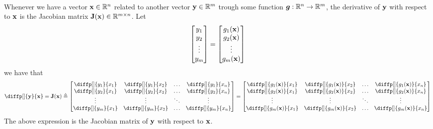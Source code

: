 \documentclass[12pt]{article}
\begin{document}
\\
Whenever we have a vector $\boldsymbol{\mathbf{x}} \in\mathbb{R}^n$ related to another vector $\boldsymbol{\mathbf{y}} \in\mathbb{R}^m$ trough some function $\boldsymbol{g}:\mathbb{R}^n\to\mathbb{R}^m$, the derivative of $\boldsymbol{\mathbf{y}}$ with respect to $\boldsymbol{\mathbf{x}}$ is the Jacobian matrix $\boldsymbol{\mathbf{J}}(\boldsymbol{\mathbf{x}}) \in\mathbb{R}^{m\times n}$. Let
\begin{equation*}
    \begin{bmatrix}
        y_1 \\ y_2 \\ \vdots \\ y_m
    \end{bmatrix} = 
    \begin{bmatrix}
        g_1(\boldsymbol{\mathbf{x}}) \\ g_2(\boldsymbol{\mathbf{x}}) \\ \vdots \\ g_m(\boldsymbol{\mathbf{x}})
    \end{bmatrix}
\end{equation*}
we have that
\renewcommand{\arraystretch}{1.5}
\begin{equation}
    \diffp[]{\bvec{y}}{\bvec{x}} = \mat{J}(\bvec{x}) \triangleq \begin{bmatrix}
        \diffp[]{y_1}{x_1} & \diffp[]{y_1}{x_2} & \dots & \diffp[]{y_1}{x_n} \\
        \diffp[]{y_2}{x_1} & \diffp[]{y_2}{x_2} & \dots & \diffp[]{y_2}{x_n} \\
        \vdots & \vdots & \ddots & \vdots \\
        \diffp[]{y_m}{x_1} & \diffp[]{y_m}{x_2} & \dots & \diffp[]{y_m}{x_n} \\
    \end{bmatrix} = 
    \begin{bmatrix}
        \diffp[]{g_1(\bvec{x})}{x_1} & \diffp[]{g_1(\bvec{x})}{x_2} & \dots & \diffp[]{g_1(\bvec{x})}{x_n} \\
        \diffp[]{g_2(\bvec{x})}{x_1} & \diffp[]{g_2(\bvec{x})}{x_2} & \dots & \diffp[]{g_2(\bvec{x})}{x_n} \\
        \vdots & \vdots & \ddots & \vdots \\
        \diffp[]{g_m(\bvec{x})}{x_1} & \diffp[]{g_m(\bvec{x})}{x_2} & \dots & \diffp[]{g_m(\bvec{x})}{x_n} \\
    \end{bmatrix}
\label{eq:jacobian-matrix}
\end{equation}
\renewcommand{\arraystretch}{1.0}
The above expression is the Jacobian matrix of $\boldsymbol{\mathbf{y}}$ with respect to $\boldsymbol{\mathbf{x}}$.
\end{document}
